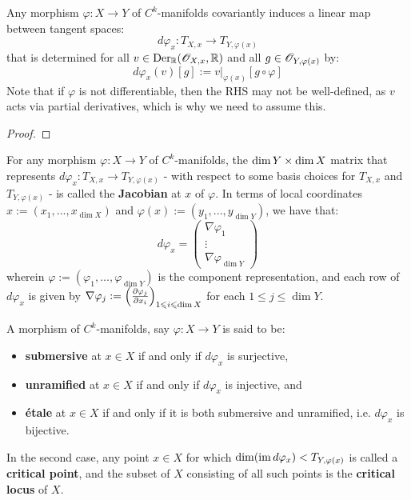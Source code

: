         \begin{corollary} \label{coro functoriality_of_tangent_spaces}
            Any morphism $\varphi: X \to Y$ of $C^k$-manifolds covariantly induces a linear map between tangent spaces:
                $$d\varphi_x: T_{X, x} \to T_{Y, \varphi(x)}$$
            that is determined for all $v \in \mathrm{Der}_{\mathbb{R}}(\mathscr{O}_{X, x}, \mathbb{R})$ and all $g \in \mathscr{O}_{Y, \varphi(x)}$ by:
                $$d\varphi_x( v )[g] := v|_{\varphi(x)}[g \circ \varphi]$$
            Note that if $\varphi$ is not differentiable, then the RHS may not be well-defined, as $v$ acts via partial derivatives, which is why we need to assume this. 
        \end{corollary}
            \begin{proof}
                
            \end{proof}
        \begin{definition}[Jacobians] \label{def: jacobian}
            For any morphism $\varphi: X \to Y$ of $C^k$-manifolds, the $\dim Y \x \dim X$ matrix that represents $d\varphi_x: T_{X, x} \to T_{Y, \varphi(x)}$ - with respect to some basis choices for $T_{X, x}$ and $T_{Y, \varphi(x)}$ - is called the \textbf{Jacobian} at $x$ of $\varphi$. In terms of local coordinates $x := (x_1, ..., x_{\dim X})$ and $\varphi(x) := (y_1, ..., y_{\dim Y})$, we have that:
                $$
                    d\varphi_x =
                    \begin{pmatrix}
                        \nabla \varphi_1
                        \\
                        \vdots
                        \\
                        \nabla \varphi_{\dim Y}
                    \end{pmatrix}
                $$
            wherein $\varphi := (\varphi_1, ..., \varphi_{\dim Y})$ is the component representation, and each row of $d\varphi_x$ is given by $\nabla \varphi_j := \left( \frac{\partial \varphi_j}{\partial x_i} \right)_{1 \leqslant i \leqslant \dim X}$ for each $1 \leq j \leq \dim Y$.  
        \end{definition}
        \begin{definition} \label{def: submersive_unramified_and_etale_morphisms}
            A morphism of $C^k$-manifolds, say $\varphi: X \to Y$ is said to be:
            \begin{itemize}
                \item \textbf{submersive} at $x \in X$ if and only if $d\varphi_x$ is surjective,
                \item \textbf{unramified} at $x \in X$ if and only if $d\varphi_x$ is injective, and
                \item \textbf{\'etale} at $x \in X$ if and only if it is both submersive and unramified, i.e. $d\varphi_x$ is bijective.
            \end{itemize}
            In the second case, any point $x \in X$ for which $\dim( \operatorname{im} d\varphi_x ) < T_{Y, \varphi(x)}$ is called a \textbf{critical point}, and the subset of $X$ consisting of all such points is the \textbf{critical locus} of $X$.
        \end{definition}
